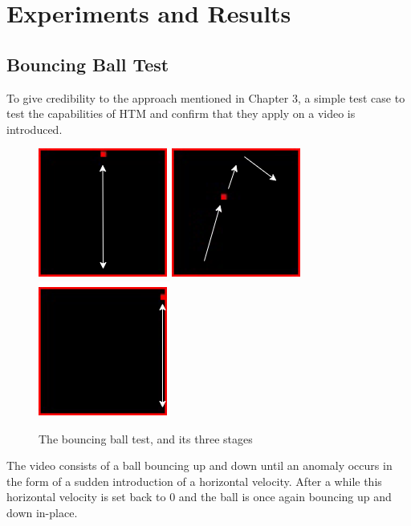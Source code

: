 \chapter{Experiments and Results}

\section{Bouncing Ball Test}
To give credibility to the approach mentioned in Chapter 3, a simple test case to test the capabilities of HTM and confirm that they apply on a video is introduced.
\begin{figure}[H]
    \centering
    \includegraphics[width=.3\textwidth]{resources/experiments/bouncing_ball/bb_updown1.png}\hfill
    \includegraphics[width=.3\textwidth]{resources/experiments/bouncing_ball/bb_updownside.png}\hfill
    \includegraphics[width=.3\textwidth]{resources/experiments/bouncing_ball/bb_updown2.png}
    \caption{The bouncing ball test, and its three stages}
    \label{fig:bb}
\end{figure}
The video consists of a ball bouncing up and down until an anomaly occurs in the form of a sudden introduction of a horizontal velocity. After a while this horizontal velocity is set back to 0 and the ball is once again bouncing up and down in-place.
